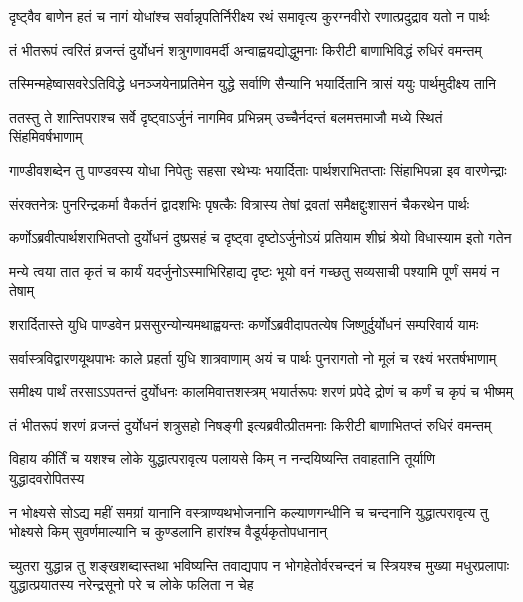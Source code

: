 \twolineshloka
{दृष्ट्वैव बाणेन हतं च नागं योधांश्च सर्वान्नृपतिर्निरीक्ष्य}
{रथं समावृत्य कुरग्नवीरो रणात्प्रदुद्राव यतो न पार्थः}


\twolineshloka
{तं भीतरूपं त्वरितं व्रजन्तं दुर्योधनं शत्रुगणावमर्दी}
{अन्वाह्वयद्योद्धुमनाः किरीटी बाणाभिविद्धं रुधिरं वमन्तम्}


\twolineshloka
{तस्मिन्महेष्वासवरेऽतिविद्धे धनञ्जयेनाप्रतिमेन युद्धे}
{सर्वाणि सैन्यानि भयार्दितानि त्रासं ययुः पार्थमुदीक्ष्य तानि}


\twolineshloka
{ततस्तु ते शान्तिपराश्च सर्वे दृष्ट्वाऽर्जुनं नागमिव प्रभिन्नम्}
{उच्चैर्नदन्तं बलमत्तमाजौ मध्ये स्थितं सिंहमिवर्षभाणाम्}


\twolineshloka
{गाण्डीवशब्देन तु पाण्डवस्य योधा निपेतुः सहसा रथेभ्यः}
{भयार्दिताः पार्थशराभितप्ताः सिंहाभिपन्ना इव वारणेन्द्राः}


\twolineshloka
{संरक्तनेत्रः पुनरिन्द्रकर्मा वैकर्तनं द्वादशभिः पृषत्कैः}
{वित्रास्य तेषां द्रवतां समैक्षद्दुःशासनं चैकरथेन पार्थः}


\twolineshloka
{कर्णोऽब्रवीत्पार्थशराभितप्तो दुर्योधनं दुष्प्रसहं च दृष्ट्वा}
{दृष्टोऽर्जुनोऽयं प्रतियाम शीघ्रं श्रेयो विधास्याम इतो गतेन}


\twolineshloka
{मन्ये त्वया तात कृतं च कार्यं यदर्जुनोऽस्माभिरिहाद्य दृष्टः}
{भूयो वनं गच्छतु सव्यसाची पश्यामि पूर्णं समयं न तेषाम्}



\twolineshloka
{शरार्दितास्ते युधि पाण्डवेन प्रससुरन्योन्यमथाह्वयन्तः}
{कर्णोऽब्रवीदापतत्येष जिष्णुर्दुर्योधनं सम्परिवार्य यामः}


\twolineshloka
{सर्वास्त्रविद्वारणयूथपाभः काले प्रहर्ता युधि शात्रवाणाम्}
{अयं च पार्थः पुनरागतो नो मूलं च रक्ष्यं भरतर्षभाणाम्}


\twolineshloka
{समीक्ष्य पार्थं तरसाऽऽपतन्तं दुर्योधनः कालमिवात्तशस्त्रम्}
{भयार्तरूपः शरणं प्रपेदे द्रोणं च कर्णं च कृपं च भीष्मम्}


\twolineshloka
{तं भीतरूपं शरणं व्रजन्तं दुर्योधनं शत्रुसहो निषङ्गी}
{इत्यब्रवीत्प्रीतमनाः किरीटी बाणाभितप्तं रुधिरं वमन्तम्}


\twolineshloka
{विहाय कीर्तिं च यशश्च लोके युद्धात्परावृत्य पलायसे किम्}
{न नन्दयिष्यन्ति तवाहतानि तूर्याणि युद्धादवरोपितस्य}


\threelineshloka
{न भोक्ष्यसे सोऽद्य महीं समग्रां यानानि वस्त्राण्यथभोजनानि}
{कल्याणगन्धीनि च चन्दनानि युद्धात्परावृत्य तु भोक्ष्यसे किम्}
{सुवर्णमाल्यानि च कुण्डलानि हारांश्च वैडूर्यकृतोपधानान्}


\threelineshloka
{च्युतरा युद्धान्न तु शङ्खशब्दास्तथा भविष्यन्ति तवाद्यपाप}
{न भोगहेतोर्वरचन्दनं च स्त्रियश्च मुख्या मधुरप्रलापाः}
{युद्धात्प्रयातस्य नरेन्द्रसूनो परे च लोके फलिता न चेह}


